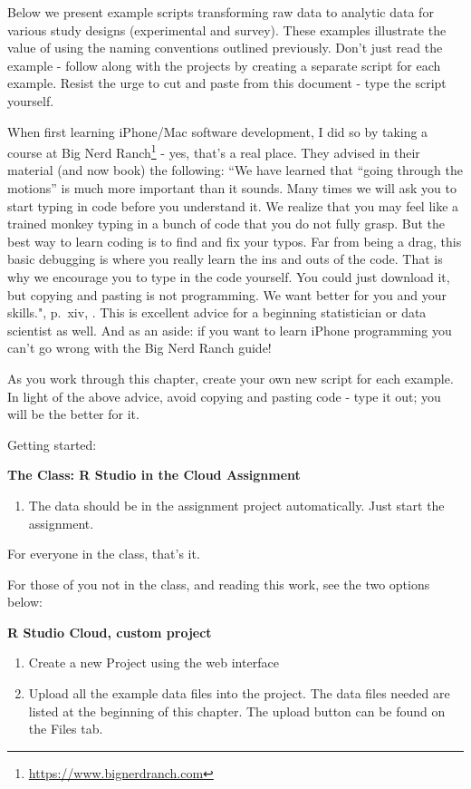 \documentclass[
]{krantz}
\providecommand{\tightlist}{%
  \setlength{\itemsep}{0pt}\setlength{\parskip}{0pt}}
\renewcommand{\href}[2]{#2\footnote{\url{#1}}}
\begin{document}
Below we present example scripts transforming raw data to analytic data for various study designs (experimental and survey). These examples illustrate the value of using the naming conventions outlined previously. Don't just read the example - follow along with the projects by creating a separate script for each example. Resist the urge to cut and paste from this document - type the script yourself.

When first learning iPhone/Mac software development, I did so by taking a course at \href{https://www.bignerdranch.com}{Big Nerd Ranch} - yes, that's a real place. They advised in their material (and now book) the following: ``We have learned that ``going through the motions'' is much more important than it sounds. Many times we will ask you to start typing in code before you understand it. We realize that you may feel like a trained monkey typing in a bunch of code that you do not fully grasp. But the best way to learn coding is to find and fix your typos. Far from being a drag, this basic debugging is where you really learn the ins and outs of the code. That is why we encourage you to type in the code yourself. You could just download it, but copying and pasting is not programming. We want better for you and your skills.", p.~xiv, \citep{keur2020}. This is excellent advice for a beginning statistician or data scientist as well. And as an aside: if you want to learn iPhone programming you can't go wrong with the Big Nerd Ranch guide!

As you work through this chapter, create your own new script for each example. In light of the above advice, avoid copying and pasting code - type it out; you will be the better for it.

Getting started:

\textbf{The Class: R Studio in the Cloud Assignment}

\begin{enumerate}
\def\labelenumi{\arabic{enumi}.}
\tightlist
\item
  The data should be in the assignment project automatically. Just start the assignment.
\end{enumerate}

For everyone in the class, that's it.

For those of you not in the class, and reading this work, see the two options below:

\textbf{R Studio Cloud, custom project}

\begin{enumerate}
\def\labelenumi{\arabic{enumi}.}
\item
  Create a new Project using the web interface
\item
  Upload all the example data files into the project. The data files needed are listed at the beginning of this chapter. The upload button can be found on the Files tab.
\end{enumerate}
\end{document}
